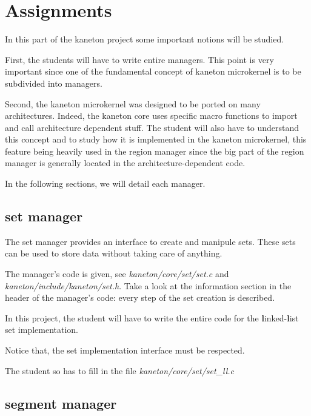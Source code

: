 %
%

\section{Assignments}

In this part of the kaneton project some important notions will be
studied.

First, the students will have to write entire managers. This point
is very important since one of the fundamental concept of kaneton microkernel
is to be subdivided into managers.

Second, the kaneton microkernel was designed to be ported on many
architectures. Indeed, the kaneton core uses specific macro functions
to import and call architecture dependent stuff. The student will also
have to understand this concept and to study how it is implemented in the
kaneton microkernel, this feature being heavily used in the region
manager since the big part of the region manager is generally located in
the architecture-dependent code.

In the following sections, we will detail each manager.

%
%

\subsection{set manager}

The set manager provides an interface to create and manipule sets. These
sets can be used to store data without taking care of anything.

The manager's code is given, see \textit{kaneton/core/set/set.c} and
\textit{kaneton/include/kaneton/set.h}. Take a look at the information
section in the header of the manager's code: every step of the set creation
is described.

In this project, the student will have to write the entire code for
the \textbf{l}inked-\textbf{l}ist set implementation.

Notice that, the set implementation interface must be respected.

The student so has to fill in the file \textit{kaneton/core/set/set\_ll.c}

%
%

\subsection{segment manager}

